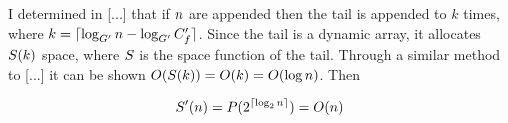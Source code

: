 I determined in [...] that if $n$ are appended then the tail is appended to $k$ times, where $k = \lceil \log_{G'} n - \log_{G'} C_f' \rceil$. Since the tail is a dynamic array, it allocates $S(k)$ space, where $S$ is the space function of the tail. Through a similar method to [...] it can be shown $O(S(k)) = O(k) = O(\log n)$. Then %

\begin{align*}
S'(n) = P(2^{\lceil \log_2 n \rceil}) = O(n)
\end{align*}